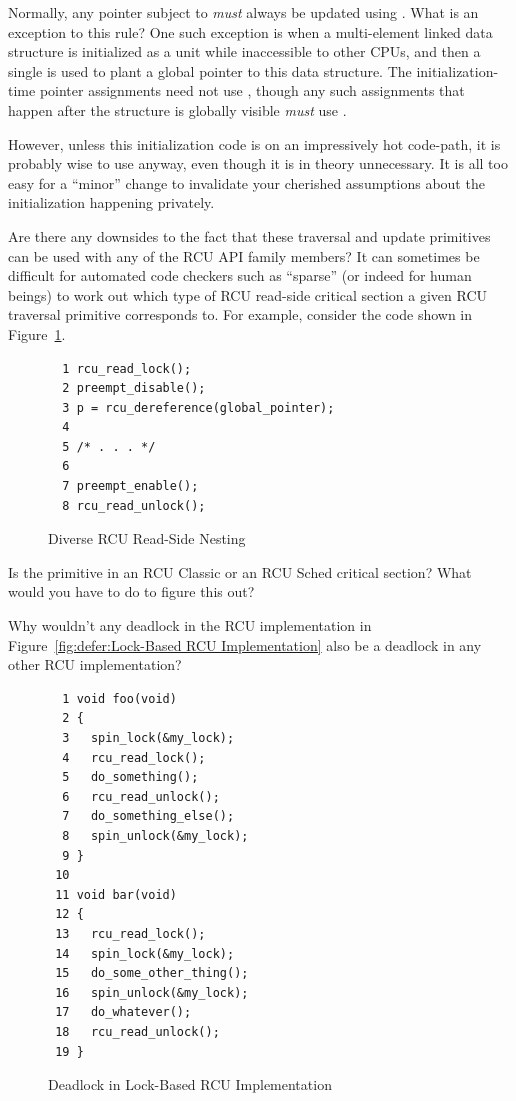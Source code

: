 \begin{enumerate}
\QuickQ{}
	Normally, any pointer subject to  \emph{must}
	always be updated using .
	What is an exception to this rule?
\QuickA{}
	One such exception is when a multi-element linked
	data structure is initialized as a unit while inaccessible to other
	CPUs, and then a single  is used
	to plant a global pointer to this data structure.
	The initialization-time pointer assignments need not use
	, though any such assignments that
	happen after the structure is globally visible \emph{must} use
	.

	However, unless this initialization code is on an impressively hot
	code-path, it is probably wise to use 
	anyway, even though it is in theory unnecessary.
	It is all too easy for a ``minor'' change to invalidate your cherished
	assumptions about the initialization happening privately.

\QuickQ{}
	Are there any downsides to the fact that these traversal and update
	primitives can be used with any of the RCU API family members?
\QuickA{}
	It can sometimes be difficult for automated
	code checkers such as ``sparse'' (or indeed for human beings) to
	work out which type of RCU read-side critical section a given
	RCU traversal primitive corresponds to.
	For example, consider the code shown in
	Figure~\ref{fig:defer:Diverse RCU Read-Side Nesting}.

\begin{figure}[htbp]
{ \centering
\begin{verbatim}
  1 rcu_read_lock();
  2 preempt_disable();
  3 p = rcu_dereference(global_pointer);
  4
  5 /* . . . */
  6
  7 preempt_enable();
  8 rcu_read_unlock();
\end{verbatim}
}
\caption{Diverse RCU Read-Side Nesting}
\label{fig:defer:Diverse RCU Read-Side Nesting}
\end{figure}

	Is the  primitive in an RCU Classic
	or an RCU Sched critical section?
	What would you have to do to figure this out?

\QuickQ{}
	Why wouldn't any deadlock in the RCU implementation in
	Figure~\ref{fig:defer:Lock-Based RCU Implementation}
	also be a deadlock in any other RCU implementation?
\QuickA{}

\begin{figure}[tbp]
{ \scriptsize
\begin{verbatim}
  1 void foo(void)
  2 {
  3   spin_lock(&my_lock);
  4   rcu_read_lock();
  5   do_something();
  6   rcu_read_unlock();
  7   do_something_else();
  8   spin_unlock(&my_lock);
  9 }
 10
 11 void bar(void)
 12 {
 13   rcu_read_lock();
 14   spin_lock(&my_lock);
 15   do_some_other_thing();
 16   spin_unlock(&my_lock);
 17   do_whatever();
 18   rcu_read_unlock();
 19 }
\end{verbatim}
}
\caption{Deadlock in Lock-Based RCU Implementation}
\label{fig:defer:Deadlock in Lock-Based RCU Implementation}
\end{figure}


\end{enumerate}
